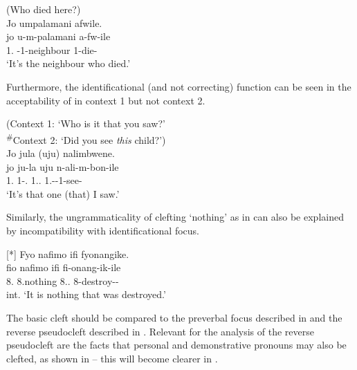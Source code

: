\documentclass[output=paper]{langscibook}
\begin{document}
\ea
\label{bkm:Ref98083872}
(Who died here?)\\
Jo umpalamani afwile.\\
\gll
jo  u-m-palamani  a-fw-ile\\
1.\IDCOP{}  \AUG{}-1-neighbour  1\SM{}-die-\PFV{}\\
\glt
‘It’s the neighbour who died.’\\

\z


Furthermore, the identificational (and not correcting) function can be seen in the acceptability of  in context 1 but not context 2.

\ea
\label{bkm:Ref98082928}
(Context 1: ‘Who is it that you saw?’\\
\textsuperscript{\#}Context 2: ‘Did you see \textit{this} child?’)\\
Jo jula (uju) nalimbwene.\\
\gll
jo  ju-la  uju  n-ali-m-bon-ile\\
1.\IDCOP{}  1-\DEM.\DIST{}  1.\DEM.\PROX{}  1\SG.\SM-\PST{}-1\OM{}-see-\PFV{}\\
\glt ‘It’s that one (that) I saw.’

\z


Similarly, the ungrammaticality of clefting ‘nothing’ as in  can also be explained by incompatibility with identificational focus.

\ea
[*]{
\label{bkm:Ref98083554}
Fyo nafimo ifi fyonangike.\\
\gll
fio  nafimo  ifi  fi-onang-ik-ile\\
8.\IDCOP{}  8.nothing  8.\DEM.\PROX{}  8\SM{}-destroy-\STAT-\PFV{}\\
\glt
int. ‘It is nothing that was destroyed.’\\
}

\z


The basic cleft should be compared to the preverbal focus described in  and the reverse pseudocleft described in . Relevant for the analysis of the reverse pseudocleft are the facts that personal and demonstrative pronouns may also be clefted, as shown in  – this will become clearer in .
\end{document}
